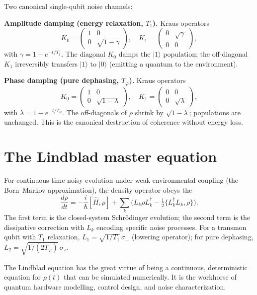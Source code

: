Two canonical single-qubit noise channels:

\textbf{Amplitude damping (energy relaxation, $T_1$).} Kraus operators
\[
  K_0 = \begin{pmatrix}1 & 0 \\ 0 & \sqrt{1-\gamma}\end{pmatrix}, \quad
  K_1 = \begin{pmatrix}0 & \sqrt{\gamma} \\ 0 & 0\end{pmatrix},
\]
with $\gamma = 1 - e^{-t/T_1}$. The diagonal $K_0$ damps the $|1\rangle$ population; the off-diagonal $K_1$ irreversibly transfers $|1\rangle$ to $|0\rangle$ (emitting a quantum to the environment).

\textbf{Phase damping (pure dephasing, $T_\varphi$).} Kraus operators
\[
  K_0 = \begin{pmatrix}1 & 0 \\ 0 & \sqrt{1-\lambda}\end{pmatrix}, \quad
  K_1 = \begin{pmatrix}0 & 0 \\ 0 & \sqrt{\lambda}\end{pmatrix},
\]
with $\lambda = 1 - e^{-t/T_\varphi}$. The off-diagonals of $\rho$ shrink by $\sqrt{1-\lambda}$; populations are unchanged. This is the canonical destruction of coherence without energy loss.

\section{The Lindblad master equation}

For continuous-time noisy evolution under weak environmental coupling (the Born--Markov approximation), the density operator obeys the 
\[
  \frac{d\rho}{dt} = -\frac{i}{\hbar}[\hat H,\rho] + \sum_k \Big(L_k\rho L_k^\dagger - \tfrac{1}{2}\{L_k^\dagger L_k,\rho\}\Big).
\]
The first term is the closed-system Schr\"odinger evolution; the second term is the dissipative correction with  $L_k$ encoding specific noise processes. For a transmon qubit with $T_1$ relaxation, $L_1 = \sqrt{1/T_1}\,\sigma_-$ (lowering operator); for pure dephasing, $L_2 = \sqrt{1/(2T_\varphi)}\,\sigma_z$.

The Lindblad equation has the great virtue of being a continuous, deterministic equation for $\rho(t)$ that can be simulated numerically. It is the workhorse of quantum hardware modelling, control design, and noise characterization.

